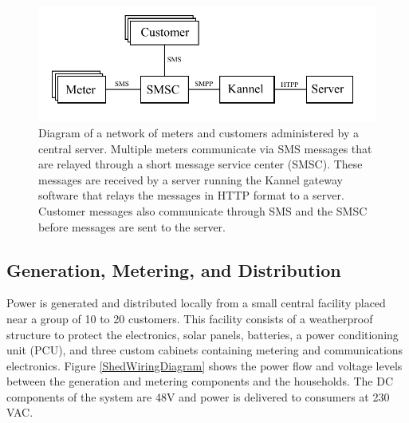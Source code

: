 \documentclass{sig-alternate}
\begin{document}
\begin{figure}[]
\begin{center}
\includegraphics[width=\columnwidth]{figures/NetworkDiagram.pdf}
\end{center}
\caption{Diagram of a network of meters and customers administered by a central server.
Multiple meters communicate via SMS messages that are relayed through a short message
service center (SMSC).  These messages are received by a server running the Kannel gateway
software that relays the messages in HTTP format to a server.  Customer messages also
communicate through SMS and the SMSC before messages are sent to the server.}
\label{NetworkDiagram}
\end{figure}

\subsection{Generation, Metering, and Distribution}
Power is generated and distributed locally from a small central facility
placed near a group of 10 to 20 customers.
This facility consists of a weatherproof structure to protect the
electronics, solar panels, batteries, a power conditioning unit (PCU),
and three custom cabinets containing metering and communications
electronics.
Figure \ref{ShedWiringDiagram} shows the power flow and voltage levels 
between the generation and
metering components and the households.
The DC components of the system are 48V and power is delivered to 
consumers at 230 VAC.
\end{document}
